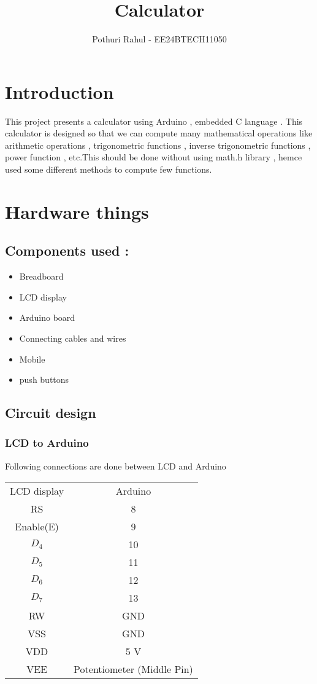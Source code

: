 \documentclass{article}
\title{Calculator}
\author{Pothuri Rahul - EE24BTECH11050}
\date{ }
\begin{document}
\maketitle

\section{Introduction}
This project presents a calculator using Arduino , embedded C language . This calculator is designed so that we can compute many mathematical operations like arithmetic operations , trigonometric functions , inverse trigonometric functions , power function , etc.This should be done without using math.h library , hemce used some different methods to compute few functions. 


\section{Hardware things}
\subsection{Components used :} 
\begin{itemize}
\item Breadboard
\item LCD display
\item Arduino board
\item Connecting cables and wires
\item Mobile
\item push buttons
\end{itemize}
\subsection{Circuit design} 
\subsubsection{LCD to Arduino}
Following connections are done between LCD and Arduino
\begin{center}
    \begin{tabular}[H]{|c|c|}
    \hline 
    LCD display & Arduino  \\
    RS & 8 \\
    \hline 
    Enable(E) & 9 \\
    \hline 
    $D_4$ & 10 \\
    \hline 
    $D_5$ & 11 \\
    \hline 
    $D_6$ & 12 \\
    \hline 
    $D_7$ & 13 \\
    \hline
    RW & GND \\
    \hline 
    VSS & GND \\
    \hline
    VDD & 5 V \\
    \hline
    VEE & Potentiometer (Middle Pin) \\
    \hline
    \end{tabular}
\end{center}
\end{document}
